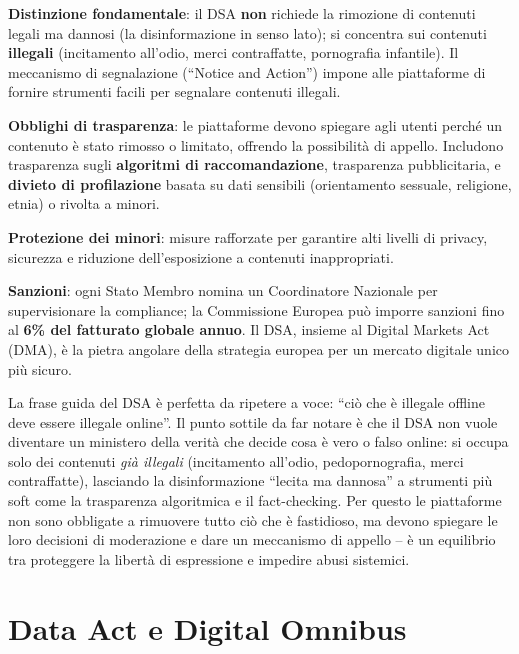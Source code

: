 \documentclass[a4paper,11pt]{article}
\begin{document}
\textbf{Distinzione fondamentale}: il DSA \textbf{non} richiede la rimozione di contenuti legali ma dannosi (la disinformazione in senso lato); si concentra sui contenuti \textbf{illegali} (incitamento all'odio, merci contraffatte, pornografia infantile). Il meccanismo di segnalazione (``Notice and Action'') impone alle piattaforme di fornire strumenti facili per segnalare contenuti illegali.

\textbf{Obblighi di trasparenza}: le piattaforme devono spiegare agli utenti perch\'{e} un contenuto \`{e} stato rimosso o limitato, offrendo la possibilit\`{a} di appello. Includono trasparenza sugli \textbf{algoritmi di raccomandazione}, trasparenza pubblicitaria, e \textbf{divieto di profilazione} basata su dati sensibili (orientamento sessuale, religione, etnia) o rivolta a minori.

\textbf{Protezione dei minori}: misure rafforzate per garantire alti livelli di privacy, sicurezza e riduzione dell'esposizione a contenuti inappropriati.

\textbf{Sanzioni}: ogni Stato Membro nomina un Coordinatore Nazionale per supervisionare la compliance; la Commissione Europea pu\`{o} imporre sanzioni fino al \textbf{6\% del fatturato globale annuo}. Il DSA, insieme al Digital Markets Act (DMA), \`{e} la pietra angolare della strategia europea per un mercato digitale unico pi\`{u} sicuro.

\begin{nota}
La frase guida del DSA \`{e} perfetta da ripetere a voce: ``ci\`{o} che \`{e} illegale offline deve essere illegale online''. Il punto sottile da far notare \`{e} che il DSA non vuole diventare un ministero della verit\`{a} che decide cosa \`{e} vero o falso online: si occupa solo dei contenuti \emph{gi\`{a} illegali} (incitamento all'odio, pedopornografia, merci contraffatte), lasciando la disinformazione ``lecita ma dannosa'' a strumenti pi\`{u} soft come la trasparenza algoritmica e il fact-checking. Per questo le piattaforme non sono obbligate a rimuovere tutto ci\`{o} che \`{e} fastidioso, ma devono spiegare le loro decisioni di moderazione e dare un meccanismo di appello -- \`{e} un equilibrio tra proteggere la libert\`{a} di espressione e impedire abusi sistemici.
\end{nota}

\section{Data Act e Digital Omnibus}
\end{document}
